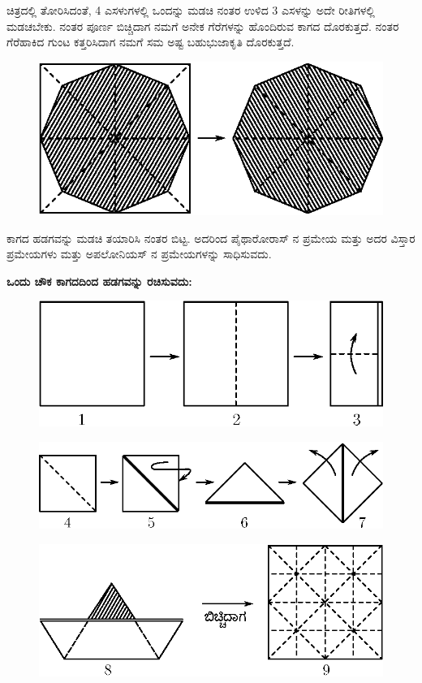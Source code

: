 \begin{itemize}
 ಚಿತ್ರದಲ್ಲಿ ತೋರಿಸಿದಂತೆ, 4 ಎಸಳುಗಳಲ್ಲಿ ಒಂದನ್ನು ಮಡಚಿ ನಂತರ ಉಳಿದ 3 ಎಸಳನ್ನು ಅದೇ ರೀತಿಗಳಲ್ಲಿ ಮಡಚಬೇಕು. ನಂತರ ಪೂರ್ಣ ಬಿಚ್ಚಿದಾಗ ನಮಗೆ ಅನೇಕ ಗೆರೆಗಳನ್ನು ಹೊಂದಿರುವ ಕಾಗದ ದೊರಕುತ್ತದೆ. ನಂತರ ಗೆರೆಹಾಕಿದ ಗುಂಟ ಕತ್ತರಿಸಿದಾಗ ನಮಗೆ ಸಮ ಅಷ್ಟ ಬಹುಭುಜಾಕೃತಿ ದೊರಕುತ್ತದೆ. 
 \begin{figure}[H]
\centering
\includegraphics[scale=.98]{src/figure/chap1/fig1-16d2.eps}
\end{figure}

ಕಾಗದ ಹಡಗವನ್ನು ಮಡಚಿ ತಯಾರಿಸಿ ನಂತರ ಬಿಟ್ಟ. ಅದರಿಂದ ಪೈಥಾರೋರಾಸ್ ನ ಪ್ರಮೇಯ ಮತ್ತು ಅದರ ವಿಸ್ತಾರ ಪ್ರಮೇಯಗಳು ಮತ್ತು ಅಪಲೋನಿಯಸ್ ನ ಪ್ರಮೇಯಗಳನ್ನು ಸಾಧಿಸುವದು. 

\noindent
\medskip
\textbf{ಒಂದು ಚೌಕ ಕಾಗದದಿಂದ ಹಡಗವನ್ನು ರಚಿಸುವದು:}
\begin{figure}[H]
\centering
\includegraphics[scale=.98]{src/figure/chap1/fig1-17a.eps}
\end{figure}
\begin{figure}[H]
\centering
\includegraphics[scale=.98]{src/figure/chap1/fig1-17b.eps}
\end{figure}
\begin{figure}[H]
\centering
\includegraphics[scale=.98]{src/figure/chap1/fig1-17c.eps}
\end{figure}


\end{itemize}
